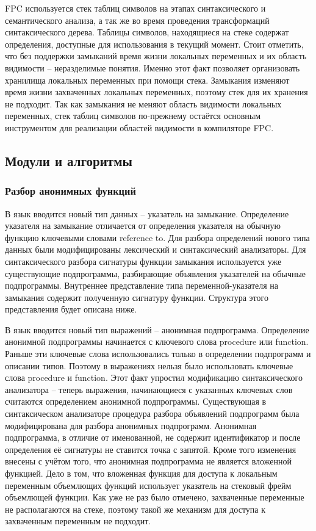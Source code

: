 \documentclass{imcs}
\begin{document}
FPC используется стек таблиц символов на этапах синтаксического и семантического анализа, а так же во время
проведения трансформаций синтаксического дерева. Таблицы символов, находящиеся на стеке содержат
определения, доступные для использования в текущий момент. Стоит отметить, что без поддержки замыканий
время жизни локальных переменных и их область видимости -- неразделимые понятия. Именно этот факт позволяет
организовать хранилища локальных переменных при помощи стека. Замыкания изменяют время жизни захваченных
локальных переменных, поэтому стек для их хранения не подходит. Так как замыкания не меняют область видимости
локальных переменных, стек таблиц символов по-прежнему остаётся основным инструментом для реализации
областей видимости в компиляторе FPC.

\subsection{Модули и алгоритмы}

\subsubsection{Разбор анонимных функций}

В язык вводится новый тип данных -- указатель на замыкание. Определение указателя на замыкание отличается от
определения указателя на обычную функцию ключевыми словами reference to. Для разбора определений нового типа
данных были модифицированы лексический и синтаксический анализаторы. Для синтаксического разбора сигнатуры функции
замыкания используется уже существующие подпрограммы, разбирающие объявления
указателей на обычные подпрограммы. Внутреннее представление типа переменной-указателя на замыкания содержит
полученную сигнатуру функции. Структура этого представления будет описана ниже. 

В язык вводится новый тип выражений -- анонимная подпрограмма. Определение анонимной подпрограммы начинается
с ключевого слова procedure или function. Раньше эти ключевые слова использовались только
в определении подпрограмм и описании типов. Поэтому в выражениях нельзя было
использовать ключевые слова procedure и function. Этот факт упростил модификацию синтаксического анализатора -- 
теперь выражения, начинающиеся с указанных ключевых слов считаются определением анонимной подпрограммы.
Существующая в синтаксическом анализаторе процедура разбора объявлений подпрограмм была модифицирована
для разбора анонимных подпрограмм. Анонимная подпрограмма, в отличие от именованной, не содержит
идентификатор и после определения её сигнатуры не ставится точка с запятой. 
Кроме того изменения внесены с учётом того, 
что анонимная подпрограмма не является вложенной функцией.
Дело в том, что вложенная функция для доступа к локальным переменным объемлющих функций использует
указатель на стековый фрейм объемлющей функции. Как уже не раз было отмечено, захваченные переменные
не располагаются на стеке, поэтому такой же механизм для доступа к захваченным переменным не подходит.
\end{document}
